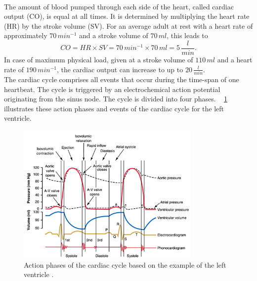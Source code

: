 \\ The amount of blood pumped through each side of the heart,  called cardiac output (CO), is equal at all times. It is determined by multiplying the heart rate (HR) by the stroke volume (SV). For an average adult at rest with a heart rate of approximately $70\, min^{-1}$ and a stroke volume of $70 \, ml$, this leads to
 \begin{equation}
   CO = HR \times SV = 70\, min^{-1} \times 70 \,ml = 5 \,\frac{l}{min}.
  \label{eq:CO}
 \end{equation}
In case of maximum physical load, given at a stroke volume of $110\,ml$ and a heart rate of $190 \, min^{-1}$,  the cardiac output can increase to up to $20\,\frac{l}{min}$. \cite{HKS4}
\\The cardiac cycle comprises all events that occur during the time-span of one heartbeat. The cycle is triggered by an electrochemical action potential originating from the sinus node. The cycle is divided into four phases. \figurename~ \ref{fig:cardiac_cycle} illustrates these action phases and events of the cardiac cycle for the left ventricle.
\begin{figure}[ht]
  \centering
  \includegraphics[width=0.8\textwidth]{images/cardiac_cycle.jpg}
  \caption[Action phases of left ventricular cardiac cycle \cite{GH20}]{Action phases of the cardiac cycle based on the example of the left ventricle \cite{GH20}.}
  \label{fig:cardiac_cycle}
\end{figure}

